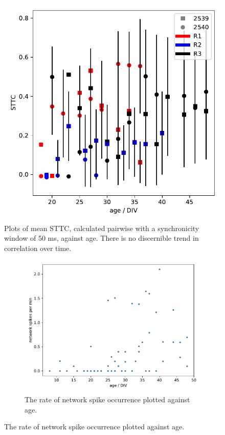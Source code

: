\documentclass[11pt]{article}
\begin{document}
{\begin{figure}
	\centering
	\includegraphics[width=\textwidth]{../plots/correlation_plots.pdf}
	\caption{Plots of mean STTC, calculated pairwise with a synchronicity window of 50 ms, against age. There is no discernible trend in correlation over time.}
	\label{fig:correlation}
\end{figure}


\begin{figure}
\centering
\begin{subfigure}[b]{0.7\textwidth}
	\centering
	\includegraphics[width=\textwidth]{../plots/network_spikes_age.pdf}
	\caption{The rate of network spike occurrence plotted against age.}
	\label{fig:networkfreq}
\end{subfigure}


\end{figure}}
\end{document}
